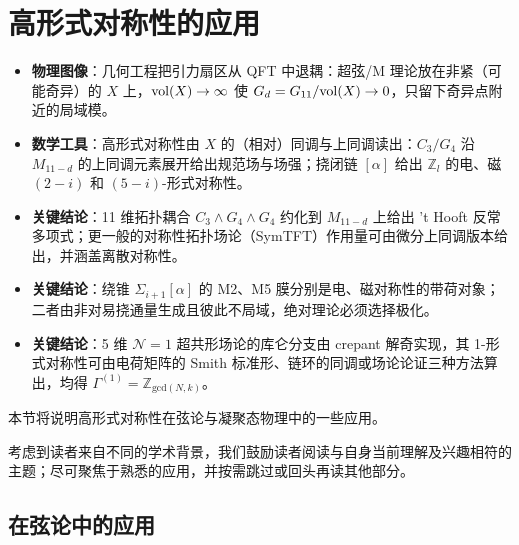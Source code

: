 
\section{高形式对称性的应用}\label{sec:applications}

\begin{keytakeaways}
  \begin{itemize}[leftmargin=1.4em,itemsep=2pt,topsep=2pt]
    \item \textbf{物理图像}：几何工程把引力扇区从 QFT 中退耦：超弦/M 理论放在非紧（可能奇异）的 $X$ 上，${\rm vol}(X)\to\infty$ 使 $G_d=G_{11}/{\rm vol}(X)\to0$，只留下奇异点附近的局域模。
    \item \textbf{数学工具}：高形式对称性由 $X$ 的（相对）同调与上同调读出：$C_3/G_4$ 沿 $M_{11-d}$ 的上同调元素展开给出规范场与场强；挠闭链 $[\alpha]$ 给出 $\mathbb{Z}_l$ 的电、磁 $(2-i)$ 和 $(5-i)$-形式对称性。
    \item \textbf{关键结论}：11 维拓扑耦合 $C_3\wedge G_4\wedge G_4$ 约化到 $M_{11-d}$ 上给出 't Hooft 反常多项式；更一般的对称性拓扑场论（SymTFT）作用量可由微分上同调版本给出，并涵盖离散对称性。
    \item \textbf{关键结论}：绕锥 $\Sigma_{i+1}[\alpha]$ 的 M2、M5 膜分别是电、磁对称性的带荷对象；二者由非对易挠通量生成且彼此不局域，绝对理论必须选择极化。
    \item \textbf{关键结论}：5 维 $\mathcal{N}=1$ 超共形场论的库仑分支由 crepant 解奇实现，其 1-形式对称性可由电荷矩阵的 Smith 标准形、链环的同调或场论论证三种方法算出，均得 $\Gamma^{(1)}=\mathbb{Z}_{\text{gcd}(N,k)}$。
  \end{itemize}
\end{keytakeaways}

本节将说明高形式对称性在弦论与凝聚态物理中的一些应用。

考虑到读者来自不同的学术背景，我们鼓励读者阅读与自身当前理解及兴趣相符的主题；尽可聚焦于熟悉的应用，并按需跳过或回头再读其他部分。

\subsection{在弦论中的应用}\label{sec:string}

